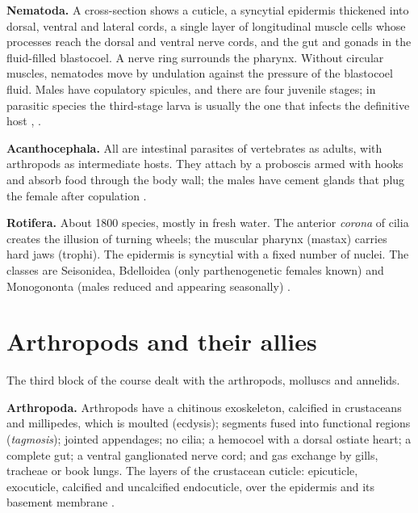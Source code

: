 \textbf{Nematoda.} A cross-section
shows a cuticle, a
syncytial epidermis thickened into dorsal,
ventral and lateral cords, a single layer of
longitudinal muscle cells whose processes
reach the dorsal and ventral nerve cords, and
the gut and gonads in the fluid-filled
blastocoel. A nerve ring surrounds the
pharynx. Without circular muscles, nematodes
move by undulation against the pressure of
the blastocoel fluid. Males have copulatory
spicules, and there are four juvenile stages;
in parasitic species the third-stage larva is
usually the one that infects the definitive
host \cite[Chapter 9]{hickman2002animal},
\cite{garciaprieto2014nematoda}.

\textbf{Acanthocephala.} All are intestinal
parasites of vertebrates as adults, with
arthropods as intermediate hosts. They attach
by a proboscis armed with hooks and absorb
food through the body wall; the males have
cement glands that plug the female after
copulation
\cite{garciaprieto2014acanthocephala}.

\textbf{Rotifera.} About 1800 species, mostly
in fresh water. The anterior \emph{corona} of
cilia creates the illusion of turning wheels;
the muscular pharynx (mastax) carries hard
jaws (trophi). The epidermis is syncytial
with a fixed number of nuclei. The classes
are Seisonidea, Bdelloidea (only
parthenogenetic females known) and
Monogononta (males reduced and appearing
seasonally) \cite[Chapter
12]{brusca2003invertebrates}.

\section{Arthropods and their allies}
\label{section-arthropods}

The third block of the course dealt with the
arthropods, molluscs and annelids.

\textbf{Arthropoda.} Arthropods have a
chitinous exoskeleton, calcified in
crustaceans and millipedes, which is moulted
(ecdysis); segments fused into functional
regions (\emph{tagmosis}); jointed
appendages; no cilia; a hemocoel with a
dorsal ostiate heart; a complete gut; a
ventral ganglionated nerve cord; and gas
exchange by gills, tracheae or book lungs.
The layers of the
crustacean cuticle: epicuticle, exocuticle,
calcified and uncalcified endocuticle, over
the epidermis and its basement membrane
\cite[Chapter 12]{hickman2002animal}.

